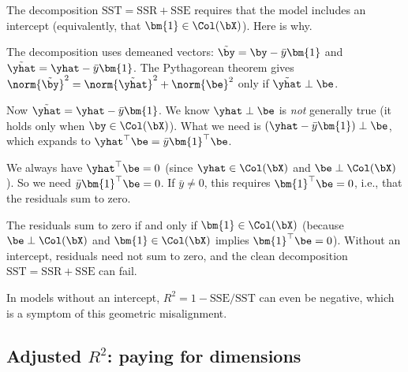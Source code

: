 
\begin{remark}[The intercept is needed for SST $=$ SSR $+$ SSE]\label{rem:intercept-decomp}
The decomposition $\text{SST} = \text{SSR} + \text{SSE}$ requires that the
model includes an intercept (equivalently, that $\bm{1}\in\Col(\bX)$).
Here is why.

The decomposition uses demeaned vectors: $\tilde{\by} = \by - \bar{y}\bm{1}$
and $\tilde{\yhat} = \yhat - \bar{y}\bm{1}$.  The Pythagorean theorem gives
$\norm{\tilde{\by}}^2 = \norm{\tilde{\yhat}}^2 + \norm{\be}^2$
only if $\tilde{\yhat}\perp\be$.

Now $\tilde{\yhat} = \yhat - \bar{y}\bm{1}$.
We know $\yhat\perp\be$ is \emph{not} generally true (it holds only when
$\by\in\Col(\bX)$).
What we need is $(\yhat - \bar{y}\bm{1})\perp\be$, which expands to
$\yhat^\top\be = \bar{y}\bm{1}^\top\be$.

We always have $\yhat^\top\be = 0$ (since $\yhat\in\Col(\bX)$ and
$\be\perp\Col(\bX)$).  So we need $\bar{y}\bm{1}^\top\be = 0$.
If $\bar{y}\ne 0$, this requires $\bm{1}^\top\be = 0$, i.e., that the
residuals sum to zero.

The residuals sum to zero if and only if $\bm{1}\in\Col(\bX)$
(because $\be\perp\Col(\bX)$ and $\bm{1}\in\Col(\bX)$ implies
$\bm{1}^\top\be = 0$).
Without an intercept, residuals need not sum to zero, and the clean
decomposition $\text{SST} = \text{SSR} + \text{SSE}$ can fail.

In models without an intercept, $R^2 = 1 - \text{SSE}/\text{SST}$
can even be negative, which is a symptom of this geometric misalignment.
\end{remark}



\subsection{Adjusted $R^2$: paying for dimensions}\label{sec:adj-r2}


